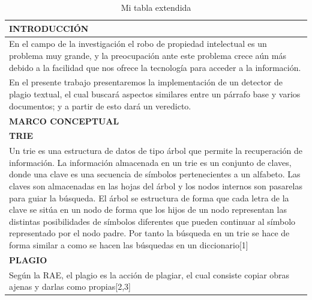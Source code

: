 \documentclass[9pt]{article}
\begin{document}
	\begin{longtable}{|p{15cm}|}
		\caption{Mi tabla extendida}\\
		\hline 
		\rowcolor{tablebackground}
		\color{white}\textbf{INTRODUCCIÓN}  \\
		\hline 
		 En el campo de la investigación el robo de  propiedad intelectual es un problema muy grande, y la preocupación ante este problema crece aún más debido a la facilidad que nos ofrece la tecnología para acceder a la información.\\
		 En el presente trabajo presentaremos la implementación de un detector de plagio textual, el cual buscará aspectos similares entre un párrafo base y varios documentos; y a partir de esto dará un veredicto.\\
		\hline 
		\rowcolor{tablebackground}
		\color{white}\textbf{MARCO CONCEPTUAL}  \\
		\hline 
		\textbf{TRIE}  \\
		Un trie es una estructura de datos de tipo árbol que permite
		la recuperación de información.
		La información almacenada en un trie es un conjunto de claves, donde 
		una clave es una secuencia de símbolos pertenecientes a un alfabeto. 
		Las claves son almacenadas en las hojas del árbol y los nodos internos 
		son pasarelas para guiar la búsqueda. El árbol se estructura de forma 
		que cada letra de la clave se sitúa en un nodo de forma que los hijos
		de un nodo representan las distintas posibilidades de símbolos diferentes
		que pueden continuar al símbolo representado por el nodo padre. Por tanto 
		la búsqueda en un trie se hace de forma similar a como se hacen las búsquedas 
		en un diccionario[1]\\	
		
		\textbf{PLAGIO}  \\
		Según la RAE, el plagio es la acción de plagiar, el cual consiste copiar obras ajenas y darlas como propias[2,3]\\	
		 

\end{longtable}
\end{document}
